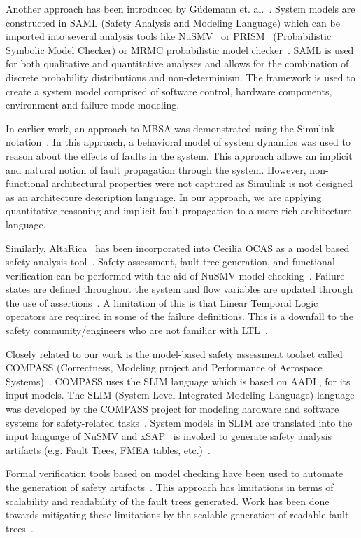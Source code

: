Another approach has been introduced by G{\"u}demann et. al.~\cite{Gudemann:2010:FQQ:1909626.1909813}. System models are constructed in SAML (Safety Analysis and Modeling Language) which can be imported into several analysis tools like NuSMV~\cite{Cimatti2000} or PRISM~\cite{CAV2011:KwNoPa} (Probabilistic Symbolic Model Checker) or MRMC probabilistic model checker~\cite{Katoen:2005:MRM:1114692.1115230}. SAML is used for both qualitative and quantitative analyses and allows for the combination of discrete probability distributions and non-determinism. The framework is used to create a system model comprised of software control, hardware components, environment and failure mode modeling. 

In earlier work, an approach to MBSA was demonstrated using the Simulink\textsuperscript{\textregistered} notation~\cite{Joshi05:SafeComp,Joshi05:Dasc}. In this approach, a behavioral model of system dynamics was used to reason about the effects of faults in the system. This approach allows an implicit and natural notion of fault propagation through the system. However, non-functional architectural properties were not captured as Simulink is not designed as an architecture description language. In our approach, we are applying quantitative reasoning and implicit fault propagation to a more rich architecture language.

Similarly, AltaRica~\cite{PROSVIRNOVA2013127} has been incorporated into Cecilia OCAS as a model based safety analysis tool~\cite{BieberERTS2018}. Safety assessment, fault tree generation, and functional verification can be performed with the aid of NuSMV model checking~\cite{symbAltaRica}. Failure states are defined throughout the system and flow variables are updated through the use of assertions~\cite{Bieber04safetyassessment}. A limitation of this is that Linear Temporal Logic operators are required in some of the failure definitions. This is a downfall to the safety community/engineers who are not familiar with LTL~\cite{Bieber04safetyassessment}. 

Closely related to our work is the model-based safety assessment toolset called COMPASS (Correctness, Modeling project and Performance of Aerospace Systems)~\cite{10.1007/978-3-642-04468-7_15}. COMPASS uses the SLIM language which is based on AADL, for its input models. The SLIM (System Level Integrated Modeling Language) language was developed by the COMPASS project for modeling hardware and software systems for safety-related tasks~\cite{5185388, criticalembeddedsystems}. System models in SLIM are translated into the input language of NuSMV and xSAP~\cite{DBLP:conf/tacas/BittnerBCCGGMMZ16} is invoked to generate safety analysis artifacts (e.g. Fault Trees, FMEA tables, etc.)~\cite{compass30toolset}.

Formal verification tools based on model checking have been used to automate the generation of safety artifacts~\cite{symbAltaRica,10.1007/978-3-540-75596-8-13, DBLP:conf/tacas/BittnerBCCGGMMZ16}. This approach has limitations in terms of scalability and readability of the fault trees generated. Work has been done towards mitigating these limitations by the scalable generation of readable fault trees~\cite{10.1007/978-3-319-11936-6-7}.

